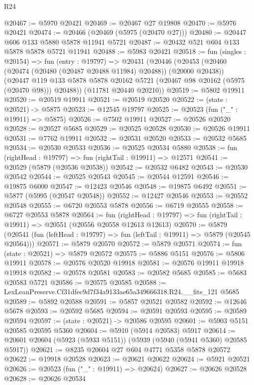 \begin{lexlean}{R24}
\begin{coremodule}
@20467 := @5970 @20421
@20469 := @20467 @27 @19808
@20470 := @5976 @20421
@20474 := @20466 (@20469 (@5975 (@20470 @27)))
@20480 := @20447 @606 @133 @5880 @5878 @11941 @5721
@20487 := @20432 @521 @604 @133 @5878 @5878 @5721 @11941
@20488 := @5983 @20421
@20518 := fun (singles : @20154) =>
  fun (entry : @19797) =>
  @20431
    (@20446
      (@20453
        (@20460 (@20474 (@20480 (@20487 @20488 @11984) @20488)) (@20000 @20438))
        (@20447 @119 @133 @5878 @5878 @20162 @5721 (@20467 @98 @20162 (@5975 (@20470 @98))) @20488))
      (@11781 @20440 @20210))
@20519 := @5802 @19911
@20520 := @20519 @19911
@20521 := @20519 @20520
@20522 := (state : @20521) -> @5875
@20523 := @12545 @19797
@20525 := @20523 (fun ("_" : @19911) => @5875)
@20526 := @7502 @19911
@20527 := @20526 @20520
@20528 := @20527 @5685
@20529 := @20525 @20528
@20530 := @20526 @19911
@20531 := @7762 @19911
@20532 := @20531 @20520
@20533 := @20532 @5685
@20534 := @20530 @20533
@20536 := @20525 @20534 @5880
@20538 := fun (rightHead : @19797) => fun (rightTail : @19911) => @12571
@20541 := @20529 (@5879 (@20536 @20538))
@20542 := @20532 @6482
@20543 := @20530 @20542
@20544 := @20525 @20543
@20545 := @20544 @12591
@20546 := @19875 @6000
@20547 := @12423 @20546
@20548 := @19875 @6492
@20551 := @5877 (@5995 (@20547 @20548))
@20552 := @12427 @20546
@20553 := @20552 @20548
@20555 := @6720 @20553 @5878
@20556 := @6719 @20555
@20558 := @6727 @20553 @5878
@20564 := fun (rightHead : @19797) =>
  fun (rightTail : @19911) => @20551 (@20556 @20558 @12613 @12613)
@20570 := @5879
    (@20541 (fun (leftHead : @19797) => fun (leftTail : @19911) => @5879 (@20545 @20564)))
@20571 := @5879 @20570
@20572 := @5879 @20571
@20574 := fun (state : @20521) => @5879 @20572
@20575 := @5886 @5151
@20576 := @5806 @19911
@20578 := @20576 @20520 @19918
@20581 := @20576 @19911 @19918 @19918
@20582 := @20578 @20581
@20583 := @20582 @5685
@20585 := @5683 @20583 @5721
@20586 := @20575 @20585
@20588 := LexLeanPreserve.Cf31dfec9d7f34a9133ae65a349666318.R24.__fits_121 @5685
@20589 := @5892 @20588
@20591 := @5857 @20521 @20582
@20592 := @12646 @5678
@20593 := @20592 @5685
@20594 := @20591 @20593
@20595 := @20589 @20594
@20597 := (state : @20521) -> @20586 @20595
@20601 := @5903 @5151 @20585 @20595 @5360
@20604 := @5910 (@5914 @20583) @5917
@20614 := @20601 @20604 (@5923 (@5933 @5151)) (@5939 (@5940 (@5941 @5360) @20585 @5917))
@20621 := @8235 @20604 @27 @604 @4771 @5358 @5878 @20572
@20622 := @19918 @20528
@20623 := @20621 @20622
@20624 := @5921 @20521
@20626 := @20523 (fun ("_" : @19911) => @20624)
@20627 := @20626 @20528
@20628 := @20626 @20534

\end{coremodule}
\end{lexlean}
